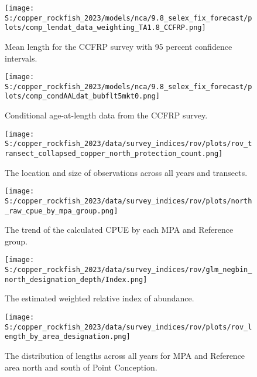 \documentclass[
  letterpaper,
]{article}
\begin{document}
\pagebreak

\begin{figure}
\centering
\texttt{[image: S:/copper\_rockfish\_2023/models/nca/9.8\_selex\_fix\_forecast/plots/comp\_lendat\_data\_weighting\_TA1.8\_CCFRP.png]}
\caption{Mean length for the CCFRP survey with 95 percent confidence intervals.\label{fig:ccfrp-mean-len-data}}
\end{figure}

\pagebreak

\begin{figure}
\centering
\texttt{[image: S:/copper\_rockfish\_2023/models/nca/9.8\_selex\_fix\_forecast/plots/comp\_condAALdat\_bubflt5mkt0.png]}
\caption{Conditional age-at-length data from the CCFRP survey.\label{fig:ccfrp-age-data}}
\end{figure}

\pagebreak

\begin{figure}
\centering
\texttt{[image: S:/copper\_rockfish\_2023/data/survey\_indices/rov/plots/rov\_transect\_collapsed\_copper\_north\_protection\_count.png]}
\caption{The location and size of observations across all years and transects.\label{fig:rov-obs-loc}}
\end{figure}

\pagebreak

\begin{figure}
\centering
\texttt{[image: S:/copper\_rockfish\_2023/data/survey\_indices/rov/plots/north\_raw\_cpue\_by\_mpa\_group.png]}
\caption{The trend of the calculated CPUE by each MPA and Reference group.\label{fig:rov-raw-cpue}}
\end{figure}

\pagebreak

\begin{figure}
\centering
\texttt{[image: S:/copper\_rockfish\_2023/data/survey\_indices/rov/glm\_negbin\_north\_designation\_depth/Index.png]}
\caption{The estimated weighted relative index of abundance.\label{fig:rov-index-main}}
\end{figure}

\pagebreak

\begin{figure}
\centering
\texttt{[image: S:/copper\_rockfish\_2023/data/survey\_indices/rov/plots/rov\_length\_by\_area\_designation.png]}
\caption{The distribution of lengths across all years for MPA and Reference area north and south of Point Conception.\label{fig:rov-len}}
\end{figure}
\end{document}
